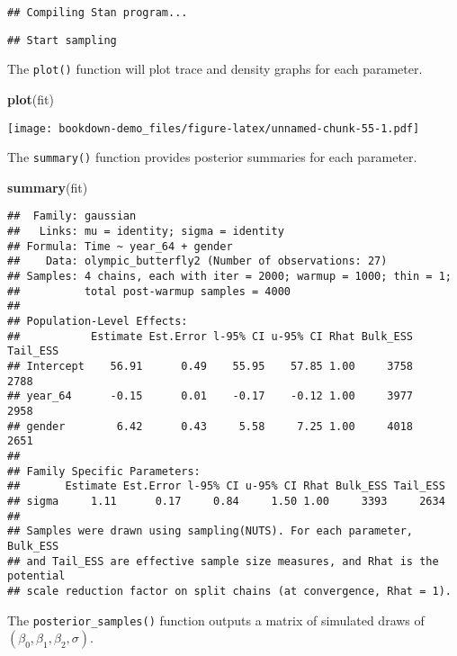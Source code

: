 \documentclass[
]{book}
\newenvironment{Shaded}{\begin{snugshade}}{\end{snugshade}}
\newcommand{\KeywordTok}[1]{\textcolor[rgb]{0.13,0.29,0.53}{\textbf{#1}}}
\newcommand{\NormalTok}[1]{#1}
\begin{document}
\begin{verbatim}
## Compiling Stan program...
\end{verbatim}

\begin{verbatim}
## Start sampling
\end{verbatim}

The \texttt{plot()} function will plot trace and density graphs for each parameter.

\begin{Shaded}
\begin{Highlighting}[]
\KeywordTok{plot}\NormalTok{(fit)}
\end{Highlighting}
\end{Shaded}

\texttt{[image: bookdown-demo\_files/figure-latex/unnamed-chunk-55-1.pdf]}

The \texttt{summary()} function provides posterior summaries for each parameter.

\begin{Shaded}
\begin{Highlighting}[]
\KeywordTok{summary}\NormalTok{(fit)}
\end{Highlighting}
\end{Shaded}

\begin{verbatim}
##  Family: gaussian 
##   Links: mu = identity; sigma = identity 
## Formula: Time ~ year_64 + gender 
##    Data: olympic_butterfly2 (Number of observations: 27) 
## Samples: 4 chains, each with iter = 2000; warmup = 1000; thin = 1;
##          total post-warmup samples = 4000
## 
## Population-Level Effects: 
##           Estimate Est.Error l-95% CI u-95% CI Rhat Bulk_ESS Tail_ESS
## Intercept    56.91      0.49    55.95    57.85 1.00     3758     2788
## year_64      -0.15      0.01    -0.17    -0.12 1.00     3977     2958
## gender        6.42      0.43     5.58     7.25 1.00     4018     2651
## 
## Family Specific Parameters: 
##       Estimate Est.Error l-95% CI u-95% CI Rhat Bulk_ESS Tail_ESS
## sigma     1.11      0.17     0.84     1.50 1.00     3393     2634
## 
## Samples were drawn using sampling(NUTS). For each parameter, Bulk_ESS
## and Tail_ESS are effective sample size measures, and Rhat is the potential
## scale reduction factor on split chains (at convergence, Rhat = 1).
\end{verbatim}

The \texttt{posterior\_samples()} function outputs a matrix of simulated draws of \((\beta_0, \beta_1, \beta_2, \sigma)\).
\end{document}

